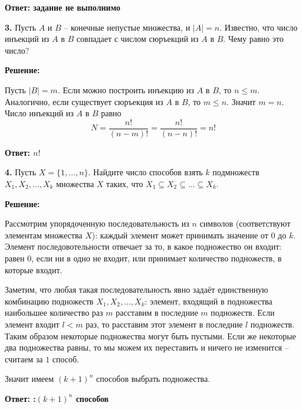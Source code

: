 \documentclass[a4paper,12pt]{article} %
\begin{document}
\begin{flushright}
\begin{large}
\textbf {Ответ: задание не выполнимо}
\end{large}
\end{flushright}

{\bf 3.} Пусть $A$ и $B$ -- конечные непустые множества, и $|A| = n$. Известно, что число инъекций из $A$ в $B$ совпадает с числом сюръекций из $A$ в $B$. Чему равно это число?
\begin{center}
\bfseries
{\Large Решение: }
\end{center}

Пусть $|B| = m$. Если можно построить инъекцию из $A$ в $B$, то $n \leqslant m$. Аналогично, если существует сюръекция из $A$ в $B$, то $m \leqslant n$. Значит $m = n$. Число инъекций из $A$ в $B$ равно
\[N = \frac{n!}{(n- m)!} = \frac{n!}{(n-n)!} = n!\]


\begin{flushright}
\begin{large}
\textbf {Ответ: $n!$}
\end{large}
\end{flushright}

{\bf 4.} Пусть $X = \{1,\dots ,n \}$. Найдите число способов взять $k$ подмножеств $X_1,X_2,\dots ,X_k$ множества $X$ таких, что $X_1 \subseteq X_2 \subseteq \dots \subseteq X_k$.
\begin{center}
\bfseries
{\Large Решение: }
\end{center}

Рассмотрим упорядоченную последовательность из $n$ символов (соответствуют элементам множества $X$): каждый элемент может принимать значение от $0$ до $k$. Элемент последовотельности отвечает за то, в какое подножество он входит: равен $0$, если ни в одно не входит, или принимает количество подножеств, в которые входит. 

Заметим, что любая такая последовательность явно задаёт единственную комбинацию подножеств $X_1, X_2, ..., X_k$: элемент, входящий в подножества наибольшее количество раз $m$ расставим в последние $m$ подножеств. Если элемент входит $l < m$ раз, то расставим этот элемент в последние $l$ подножеств. Таким образом некоторые подножества могут быть пустыми. Если же некоторые два подножества равны, то мы можем их переставить и ничего не изменится -- считаем за $1$ способ.

Значит имеем $(k+1)^n$ способов выбрать подножества.


\begin{flushright}
\begin{large}
\textbf {Ответ: :$(k+1)^n$ способов}
\end{large}
\end{flushright}
\end{document}
